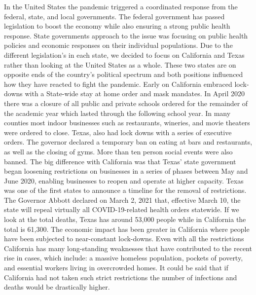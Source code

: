 \documentclass[a4paper,10pt]{article}
\begin{document}
In the United States the pandemic triggered a coordinated response from the federal, state, and local governments. The federal government has passed legislation to boost the economy while also ensuring a strong public health response. State governments approach to the issue was focusing on public health policies and economic responses on their individual populations\textsuperscript{\cite{USADisc1}}. Due to the different legislation's in each state, we decided to focus on California and Texas rather than looking at the United States as a whole. These two states are on opposite ends of the country's political spectrum and both positions influenced how they have reacted to fight the pandemic.\textsuperscript{\cite{Tex&CAlDisc1}}  Early on California embraced lock-downs with a State-wide stay at home order and mask mandates. In April 2020 there was a closure of all public and private schools ordered for the remainder of the academic year which lasted through the following school year. In many counties most indoor businesses such as restaurants, wineries, and movie theaters were ordered to close.\textsuperscript{\cite{CalDisc1}} Texas, also had lock downs with a series of executive orders. The governor declared a temporary ban on eating at bars and restaurants, as well as the closing of gyms. More than ten person social events were also banned. \textsuperscript{\cite{TexDisc1}} The big difference with California was that Texas' state government began loosening restrictions on businesses in a series of phases between May and June 2020, enabling businesses to reopen and operate at higher capacity. Texas was one of the first states to announce a timeline for the removal of restrictions. The Governor Abbott declared on March 2, 2021 that, effective March 10, the state will repeal virtually all COVID-19-related health orders statewide. If we look at the total deaths, Texas has around 53,000 people while in California the total is 61,300. The economic impact has been greater in California where people have been subjected to near-constant lock-downs. Even with all the restrictions California has many long-standing weaknesses that have contributed to the recent rise in cases, which include: a massive homeless population, pockets of poverty, and essential workers living in overcrowded homes.\textsuperscript{\cite{Tex&CAlDisc1}} It could be said that if California had not taken such strict restrictions the number of infections and deaths would be drastically higher.\\
\end{document}
